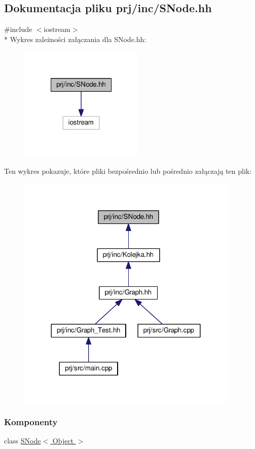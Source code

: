 \hypertarget{_s_node_8hh}{\subsection{Dokumentacja pliku prj/inc/\-S\-Node.hh}
\label{_s_node_8hh}
}
{\ttfamily \#include $<$iostream$>$}\\*
Wykres zależności załączania dla S\-Node.\-hh\-:
\nopagebreak
\begin{figure}[H]
\begin{center}
\leavevmode
\includegraphics[width=168pt]{_s_node_8hh__incl}
\end{center}
\end{figure}
Ten wykres pokazuje, które pliki bezpośrednio lub pośrednio załączają ten plik\-:
\nopagebreak
\begin{figure}[H]
\begin{center}
\leavevmode
\includegraphics[width=300pt]{_s_node_8hh__dep__incl}
\end{center}
\end{figure}
\subsubsection*{Komponenty}
\begin{DoxyCompactItemize}
\item 
class \hyperlink{class_s_node}{S\-Node$<$ Object $>$}
\end{DoxyCompactItemize}
